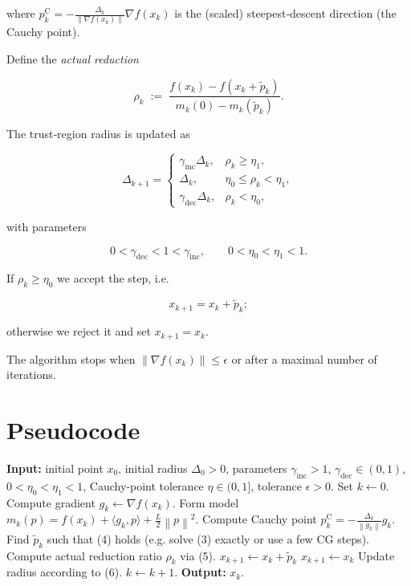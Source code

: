 \documentclass[11pt]{article}
\newcommand{\norm}[1]{\left\lVert #1\right\rVert}
\begin{document}
where \(p_k^{\mathrm{C}} = -\frac{\Delta_k}{\norm{\nabla f(x_k)}}\nabla f(x_k)\) is the (scaled) steepest‑descent direction (the Cauchy point).  

Define the \emph{actual reduction}  

\[
\rho_k \;:=\; \frac{f(x_k)-f(x_k+\tilde p_k)}{m_k(0)-m_k(\tilde p_k)}.
\tag{5}
\]

The trust‑region radius is updated as  

\[
\Delta_{k+1}= 
\begin{cases}
\gamma_{\mathrm{inc}}\Delta_k , & \rho_k \ge \eta_1,\\[4pt]
\Delta_k , & \eta_0 \le \rho_k < \eta_1,\\[4pt]
\gamma_{\mathrm{dec}}\Delta_k , & \rho_k < \eta_0,
\end{cases}
\tag{6}
\]

with parameters  

\[
0<\gamma_{\mathrm{dec}}<1<\gamma_{\mathrm{inc}},\qquad 0<\eta_0<\eta_1<1 .
\]

If \(\rho_k\ge \eta_0\) we accept the step, i.e.  

\[
x_{k+1}=x_k+\tilde p_k ;
\tag{7}
\]

otherwise we reject it and set \(x_{k+1}=x_k\).

The algorithm stops when \(\norm{\nabla f(x_k)}\le\epsilon\) or after a maximal number of iterations.

\section{Pseudocode}
\begin{algorithm}[H]
\caption{Convex Trust‑Region (CTR) Method}
\begin{algorithmic}[1]
\STATE \textbf{Input:} initial point \(x_0\), initial radius \(\Delta_0>0\), 
parameters \(\gamma_{\mathrm{inc}}>1\), \(\gamma_{\mathrm{dec}}\in(0,1)\), 
\(0<\eta_0<\eta_1<1\), Cauchy‑point tolerance \(\eta\in(0,1]\), tolerance \(\epsilon>0\).
\STATE Set \(k\gets0\).
\WHILE{\(\norm{\nabla f(x_k)}>\epsilon\)}
    \STATE Compute gradient \(g_k\gets\nabla f(x_k)\).
    \STATE Form model \(m_k(p)=f(x_k)+\langle g_k,p\rangle+\frac{L}{2}\norm{p}^{2}\).
    \STATE Compute Cauchy point \(p_k^{\mathrm{C}}=-\frac{\Delta_k}{\norm{g_k}}g_k\).
    \STATE Find \(\tilde p_k\) such that (4) holds (e.g. solve (3) exactly or use a few CG steps).
    \STATE Compute actual reduction ratio \(\rho_k\) via (5).
        \STATE \(x_{k+1}\gets x_k+\tilde p_k\) \hfill{}
    \ELSE
        \STATE \(x_{k+1}\gets x_k\) \hfill{}
    \ENDIF
    \STATE Update radius according to (6).
    \STATE \(k\gets k+1\).
\ENDWHILE
\STATE \textbf{Output:} \(x_k\).
\end{algorithmic}
\end{algorithm}
\end{document}
